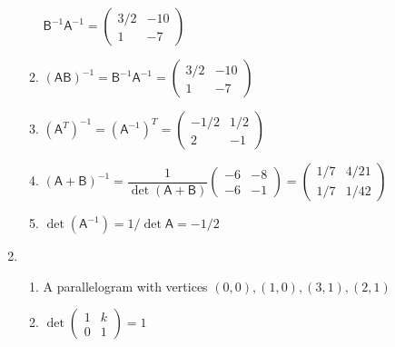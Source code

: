 \begin{enumerate}
\begin{enumerate}
$\mathsf{B}^{-1}\mathsf{A}^{-1} = \begin{pmatrix} 3/2 & -10 \\ 1 & -7 \end{pmatrix}$
\item $(\mathsf{AB})^{-1} = \mathsf{B}^{-1}\mathsf{A}^{-1} = \begin{pmatrix} 3/2 & -10 \\ 1 & -7 \end{pmatrix}$
\item $(\mathsf{A}^T)^{-1} = (\mathsf{A}^{-1})^T = \begin{pmatrix} -1/2 & 1/2 \\ 2 & -1 \end{pmatrix}$
\item $(\mathsf{A} + \mathsf{B})^{-1} = \dfrac{1}{\det(\mathsf{A} + \mathsf{B})}\begin{pmatrix} -6 & -8 \\ -6 & -1 \end{pmatrix} = \begin{pmatrix} 1/7 & 4/21 \\ 1/7 & 1/42 \end{pmatrix}$
\item $\det(\mathsf{A}^{-1}) = 1/\det\mathsf{A} = -1/2$
\end{enumerate}
\item \begin{enumerate}
\item A parallelogram with vertices $(0,0), (1,0), (3,1), (2,1)$
\item $\det\begin{pmatrix} 1 & k \\ 0 & 1 \end{pmatrix} = 1$

\end{enumerate}
\end{enumerate}
